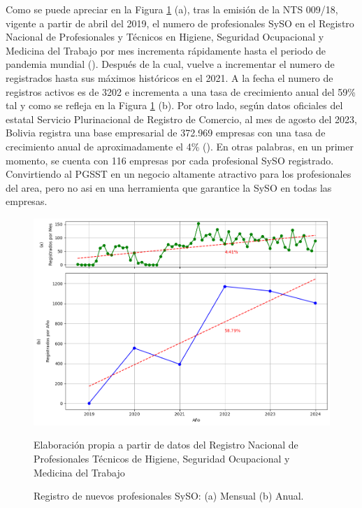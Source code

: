 Como se puede apreciar en la Figura \ref{figs:profesionales_syso_registrados} (a), tras la emisión de la NTS 009/18, vigente a partir de abril del 2019, el numero de profesionales SySO en el Registro Nacional de Profesionales y Técnicos en Higiene, Seguridad Ocupacional y Medicina del Trabajo por mes incrementa rápidamente hasta el periodo de pandemia mundial (\cite{platto2021history}). Después de la cual, vuelve a incrementar el numero de registrados hasta sus máximos históricos en el 2021. A la fecha el numero de registros activos es de 3202 e incrementa a una tasa de crecimiento anual del 59\% tal y como se refleja en la Figura \ref{figs:profesionales_syso_registrados} (b). Por otro lado, según datos oficiales del estatal Servicio Plurinacional de Registro de Comercio, al mes de agosto del 2023, Bolivia registra una base empresarial de 372.969 empresas con una tasa de crecimiento anual de aproximadamente el 4\% (\cite{ministeriodesarrollo2024}). En otras palabras, en un primer momento, se cuenta con 116 empresas por cada profesional SySO registrado. Convirtiendo al PGSST en un negocio altamente atractivo para los profesionales del area, pero no asi en una herramienta que garantice la SySO en todas las empresas.

\begin{figure}[htb]
	\centering
	\includegraphics[width=\textwidth]{images/marcoref/tendencia_profesionales_syso_registrados.png}
	\caption{Registro de nuevos profesionales SySO: (a) Mensual (b) Anual.} \vspace{-0.2cm}
	\footnotesize{Elaboración propia a partir de datos del Registro Nacional de Profesionales Técnicos de Higiene, Seguridad Ocupacional y Medicina del Trabajo}
	\label{figs:profesionales_syso_registrados} 
\end{figure}

